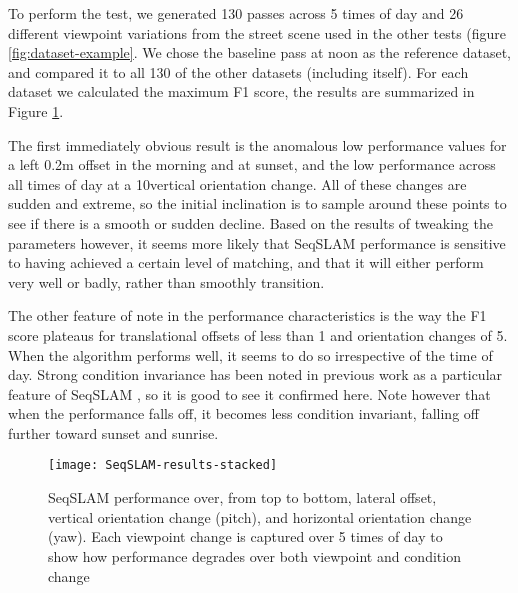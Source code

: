\documentclass[letterpaper, 10 pt, conference]{ieeeconf}  %
\begin{document}
To perform the test, we generated 130 passes across 5 times of day and 26 different viewpoint variations from the street scene used in the other tests (figure \ref{fig:dataset-example}. We chose the baseline pass at noon as the reference dataset, and compared it to all 130 of the other datasets (including itself). For each dataset we calculated the maximum F1 score, the results are summarized in Figure \ref{fig:seqslam-results-stacked}.

The first immediately obvious result is the anomalous low performance values for a left 0.2m offset in the morning and at sunset, and the low performance across all times of day at a 10\degree vertical orientation change.  All of these changes are sudden and extreme, so the initial inclination is to sample around these points to see if there is a smooth or sudden decline. Based on the results of tweaking the parameters however, it seems more likely that SeqSLAM performance is sensitive to having achieved a certain level of matching, and that it will either perform very well or badly, rather than smoothly transition.

The other feature of note in the performance characteristics is the way the F1 score plateaus for translational offsets of less than 1 and orientation changes of 5\degree. When the algorithm performs well, it seems to do so irrespective of the time of day. Strong condition invariance has been noted in previous work as a particular feature of SeqSLAM \cite{Milford2012}, so it is good to see it confirmed here. Note however that when the performance falls off, it becomes less condition invariant, falling off further toward sunset and sunrise.

\begin{figure}[t]
    \texttt{[image: SeqSLAM-results-stacked]}
    \caption{SeqSLAM performance over, from top to bottom, lateral offset, vertical orientation change (pitch), and horizontal orientation change (yaw). Each viewpoint change is captured over 5 times of day to show how performance degrades over both viewpoint and condition change}
    \label{fig:seqslam-results-stacked}
\end{figure}

\end{document}
